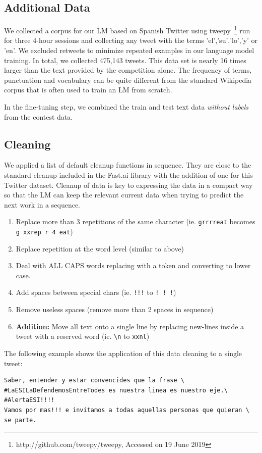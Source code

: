 \documentclass[runningheads]{llncs}
\begin{document}
\subsection{Additional Data}
We collected a corpus for our LM based on Spanish Twitter using tweepy~\footnote{http://github.com/tweepy/tweepy, Accessed on 19 June 2019} run for three 4-hour sessions and collecting any tweet with the terms 'el','su','lo','y' or 'en'. We excluded retweets to minimize repeated examples in our language model training.  In total, we collected 475,143 tweets.  This data set is nearly 16 times larger than the text provided by the competition alone.  The frequency of terms, punctuation and vocabulary can be quite different from the standard Wikipedia corpus that is often used to train an LM from scratch.  

In the fine-tuning step, we combined the train and test text data \textit{without labels} from the contest data.
\subsection{Cleaning}
We applied a list of default cleanup functions in sequence.  They are close to the standard cleanup included in the Fast.ai library with the addition of one for this Twitter dataset. Cleanup of data is key to expressing the data in a compact way so that the LM can keep the relevant current data when trying to predict the next work in a sequence.
\begin{enumerate}
	\item Replace more than 3 repetitions of the same character (ie. \verb|grrrreat| becomes \verb|g xxrep r 4 eat|)
	\item Replace repetition at the word level (similar to above)
	\item Deal with ALL CAPS words replacing with a token and converting to lower case.
	\item Add spaces between special chars (ie. \verb|!!!| to \verb|! ! !|)
	\item Remove useless spaces (remove more than 2 spaces in sequence)	
	\item \textbf{Addition:} Move all text onto a single line by replacing new-lines inside a tweet with a reserved word (ie. \verb|\n| to \verb|xxnl|)
\end{enumerate} 
The following example shows the application of this data cleaning to a single tweet:
\begin{verbatim} 
Saber, entender y estar convencides que la frase \
#LaESILaDefendemosEntreTodes es nuestra linea es nuestro eje.\
#AlertaESI!!!!
Vamos por mas!!! e invitamos a todas aquellas personas que quieran \
se parte.
\end{verbatim}
\end{document}
